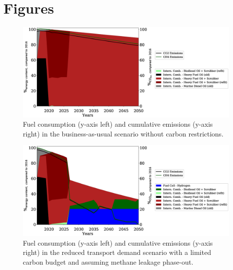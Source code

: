 \documentclass[article]{elsarticle}
\begin{document}
\section{Figures}
\begin{figure}[h]
    \centering
    \includegraphics[width=\textwidth]{figures/BAU_fuels_emissions.eps}
    \caption{Fuel consumption (y-axis left) and cumulative emissions (y-axis right) in the business-as-usual scenario without carbon restrictions.}
    \label{fig:BAU}
\end{figure}
\begin{figure}[h]
    \centering
    \includegraphics[width=\textwidth]{figures/TDVAR_fuels_emissions.eps}
    \caption{Fuel consumption (y-axis left) and cumulative emissions (y-axis right) in the reduced transport demand scenario with a limited carbon budget and assuming methane leakage phase-out.}
    \label{fig:TDV}
\end{figure}
\end{document}
